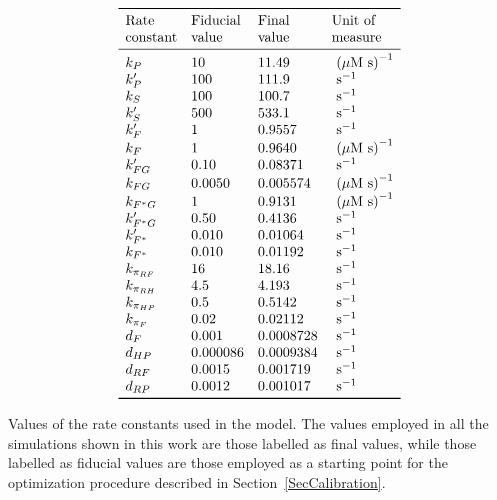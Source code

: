 \documentclass[oneside, 10pt, a4paper, twocolumn]{article}
\begin{document}
\begin{table}[h!]
\[\begin{array}{llll}
\toprule
    \text{Rate} & \text{Fiducial}  & \text{Final} & \text{Unit of}\\
        \text{constant} & \text{value}  & \text{value} & \text{measure}\\

\midrule
    k_P          & 10       & 11.49 & \text{ ($\mu$M s)}^{-1} \\
    k_P'         & 100      & 111.9 & \text{ s}^{-1}         \\
    k_S          & 100      & 100.7 & \text{ s}^{-1}          \\
    k_S'         & 500      & 533.1 & \text{ s}^{-1}          \\
    k_F'         & 1        & 0.9557 & \text{ s}^{-1}          \\
    k_F          & 1        & 0.9640 & \text{ ($\mu$M s)}^{-1} \\
    k_{FG}'      & 0.10     & 0.08371 & \text{ s}^{-1}          \\
    k_{FG}       & 0.0050   & 0.005574 & \text{ ($\mu$M s)}^{-1} \\
    k_{F^*G}     & 1        & 0.9131 & \text{ ($\mu$M s)}^{-1} \\
    k_{F^*G}'    & 0.50     & 0.4136 & \text{ s}^{-1}          \\
    k_{F^*}'     & 0.010    & 0.01064 & \text{ s}^{-1}          \\
    k_{F^*}      & 0.010    &  0.01192 & \text{ s}^{-1}          \\
    k_{\pi_{RF}} & 16       & 18.16 & \text{ s}^{-1}          \\
    k_{\pi_{RH}} & 4.5      & 4.193 & \text{ s}^{-1}          \\
    k_{\pi_{HP}} & 0.5      & 0.5142 & \text{ s}^{-1}          \\
    k_{\pi_F}    & 0.02     & 0.02112 & \text{ s}^{-1}          \\
    d_{F}        & 0.001    & 0.0008728 & \text{ s}^{-1}          \\
    d_{HP}       & 0.000086 & 0.0009384 & \text{ s}^{-1}          \\
    d_{RF}       & 0.0015   & 0.001719 & \text{ s}^{-1}          \\
    d_{RP}       & 0.0012   & 0.001017 & \text{ s}^{-1}          \\
\bottomrule
\end{array}\]
\caption{Values of the rate constants used in the model. The values employed in all the simulations shown in this work are those labelled as final values, while those labelled as fiducial values are those employed as a starting point for the optimization procedure described in Section~\ref{SecCalibration}.}\label{TabKs}
\end{table}
\end{document}
